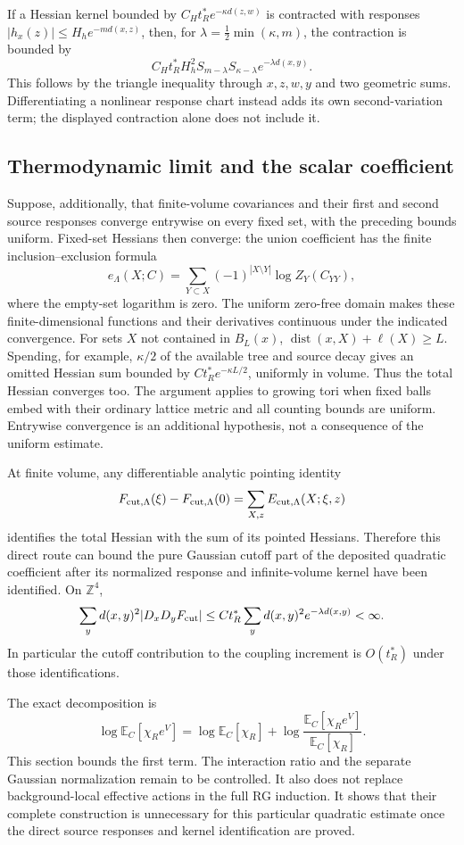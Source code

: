 \documentclass[11pt]{article}
\theoremstyle{remark}
\newcommand{\E}{\mathbb E}
\begin{document}
If a Hessian kernel bounded by $C_Ht_R^*e^{-\kappa d(z,w)}$ is
contracted with responses
$|h_x(z)|\le H_he^{-m d(x,z)}$, then, for
$\lambda=\frac12\min(\kappa,m)$, the contraction is bounded by
\[
 C_Ht_R^*H_h^2S_{m-\lambda}S_{\kappa-\lambda}
 e^{-\lambda d(x,y)}.
\]
This follows by the triangle inequality through $x,z,w,y$ and two
geometric sums. Differentiating a nonlinear response chart instead
adds its own second-variation term; the displayed contraction alone
does not include it.

\subsection{Thermodynamic limit and the scalar coefficient}

Suppose, additionally, that finite-volume covariances and their first
and second source responses converge entrywise on every fixed set,
with the preceding bounds uniform. Fixed-set Hessians then converge:
the union coefficient has the finite inclusion--exclusion formula
\[
 e_\Lambda(X;C)=\sum_{Y\subset X}(-1)^{|X\setminus Y|}
       \log Z_Y(C_{YY}),
\]
where the empty-set logarithm is zero. The uniform zero-free domain
makes these finite-dimensional functions and their derivatives
continuous under the indicated convergence.
For sets $X$ not contained in $B_L(x)$,
$\operatorname{dist}(x,X)+\ell(X)\ge L$.
Spending, for example, $\kappa/2$ of the available tree and source
decay gives an omitted Hessian sum bounded by
$C t_R^*e^{-\kappa L/2}$, uniformly in volume. Thus the total Hessian
converges too. The argument applies to growing tori when fixed balls
embed with their ordinary lattice metric and all counting bounds are
uniform. Entrywise convergence is an additional hypothesis, not a
consequence of the uniform estimate.

At finite volume, any differentiable analytic pointing identity
\[
 F_{{\rm cut},\Lambda}(\xi)-F_{{\rm cut},\Lambda}(0)
 =\sum_{X,z}E_{{\rm cut},\Lambda}(X;\xi,z)
\]
identifies the total Hessian with the sum of its pointed Hessians.
Therefore this direct route can bound the pure Gaussian cutoff part
of the deposited quadratic coefficient after its normalized response
and infinite-volume kernel have been identified. On $\mathbb Z^4$,
\[
 \sum_y d(x,y)^2|D_xD_yF_{\rm cut}|
 \le C t_R^*\sum_y d(x,y)^2e^{-\lambda d(x,y)}<\infty.
\]
In particular the cutoff contribution to the coupling increment is
$O(t_R^*)$ under those identifications.

The exact decomposition is
\[
 \log\E_C[\chi_R e^V]
 =\log\E_C[\chi_R]
 +\log\frac{\E_C[\chi_R e^V]}{\E_C[\chi_R]}.
\]
This section bounds the first term. The interaction ratio and the
separate Gaussian normalization remain to be controlled. It also
does not replace background-local effective actions in the full RG
induction. It shows that their complete construction is unnecessary
for this particular quadratic estimate once the direct source
responses and kernel identification are proved.
\end{document}
